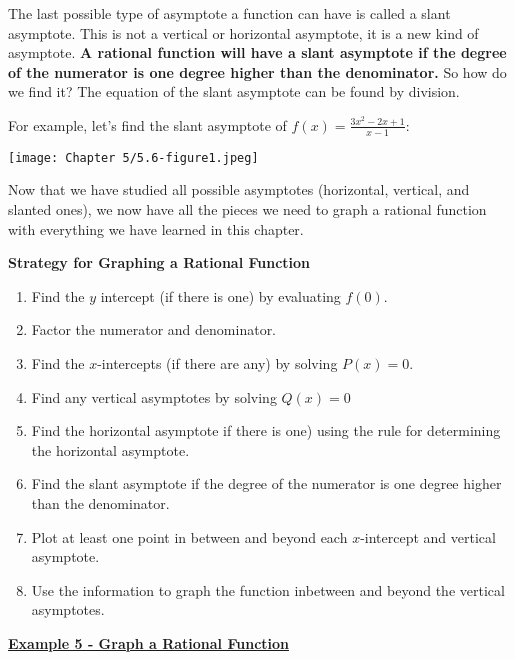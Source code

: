 \documentclass[12pt]{book}
\newcommand{\D}{\displaystyle}
\begin{document}
\newpage



\newpage
The last possible type of asymptote a function can have is called a slant asymptote. This is not a vertical or horizontal asymptote, it is a new kind of asymptote. \textbf{A rational function will have a slant asymptote if the degree of the numerator is one degree higher than the denominator.} So how do we find it? The equation of the slant asymptote can be found by division. 

For example, let's find the slant asymptote of $\D f(x)=\frac{3x^2-2x+1}{x-1}$:

\vspace{100mm}
\texttt{[image: Chapter 5/5.6-figure1.jpeg]}


\newpage
Now that we have studied all possible asymptotes (horizontal, vertical, and slanted ones), we now have all the pieces we need to graph a rational function with everything we have learned in this chapter. 

\begin{boxR}
    \textbf{Strategy for Graphing a Rational Function}
    \vspace{1mm}
    \hline
    \vspace{2mm}
    \begin{enumerate}
        \item Find the $y$ intercept (if there is one) by evaluating $f(0)$.
        \item Factor the numerator and denominator.
        \item Find the $x$-intercepts (if there are any) by solving $P(x)=0$.
        \item Find any vertical asymptotes by solving $Q(x)=0$
        \item Find the horizontal asymptote if there is one) using the rule for determining the horizontal asymptote.
        \item Find the slant asymptote if the degree of the numerator is one degree higher than the denominator.
        \item Plot at least one point in between and beyond each $x$-intercept and vertical asymptote. 
        \item Use the information to graph the function inbetween and beyond the vertical asymptotes. 
    \end{enumerate}
\end{boxR}
\vspace{5mm}

\underline{\textbf{Example 5 - Graph a Rational Function}}
\end{document}
